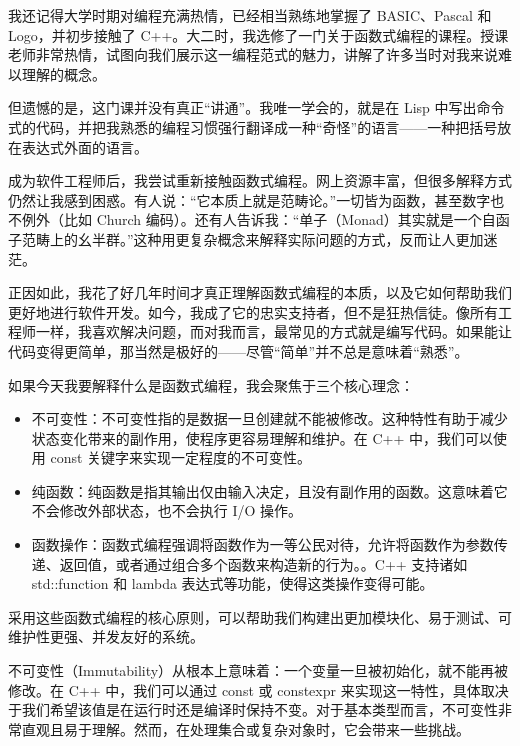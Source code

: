 
我还记得大学时期对编程充满热情，已经相当熟练地掌握了 BASIC、Pascal 和 Logo，并初步接触了 C++。大二时，我选修了一门关于函数式编程的课程。授课老师非常热情，试图向我们展示这一编程范式的魅力，讲解了许多当时对我来说难以理解的概念。

但遗憾的是，这门课并没有真正“讲通”。我唯一学会的，就是在 Lisp 中写出命令式的代码，并把我熟悉的编程习惯强行翻译成一种“奇怪”的语言——一种把括号放在表达式外面的语言。

成为软件工程师后，我尝试重新接触函数式编程。网上资源丰富，但很多解释方式仍然让我感到困惑。有人说：“它本质上就是范畴论。”一切皆为函数，甚至数字也不例外（比如 Church 编码）。还有人告诉我：“单子（Monad）其实就是一个自函子范畴上的幺半群。”这种用更复杂概念来解释实际问题的方式，反而让人更加迷茫。

正因如此，我花了好几年时间才真正理解函数式编程的本质，以及它如何帮助我们更好地进行软件开发。如今，我成了它的忠实支持者，但不是狂热信徒。像所有工程师一样，我喜欢解决问题，而对我而言，最常见的方式就是编写代码。如果能让代码变得更简单，那当然是极好的——尽管“简单”并不总是意味着“熟悉”。

如果今天我要解释什么是函数式编程，我会聚焦于三个核心理念： 

\begin{itemize}
\item 
不可变性：不可变性指的是数据一旦创建就不能被修改。这种特性有助于减少状态变化带来的副作用，使程序更容易理解和维护。在 C++ 中，我们可以使用 const 关键字来实现一定程度的不可变性。

\item 
纯函数：纯函数是指其输出仅由输入决定，且没有副作用的函数。这意味着它不会修改外部状态，也不会执行 I/O 操作。

\item 
函数操作：函数式编程强调将函数作为一等公民对待，允许将函数作为参数传递、返回值，或者通过组合多个函数来构造新的行为。。C++ 支持诸如 std::function 和 lambda 表达式等功能，使得这类操作变得可能。 
\end{itemize}

采用这些函数式编程的核心原则，可以帮助我们构建出更加模块化、易于测试、可维护性更强、并发友好的系统。


不可变性（Immutability）从根本上意味着：一个变量一旦被初始化，就不能再被修改。在 C++ 中，我们可以通过 const 或 constexpr 来实现这一特性，具体取决于我们希望该值是在运行时还是编译时保持不变。对于基本类型而言，不可变性非常直观且易于理解。然而，在处理集合或复杂对象时，它会带来一些挑战。

